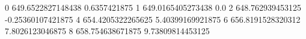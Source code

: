 0 649.6522827148438 0.6357421875
1 649.0165405273438 0.0
2 648.762939453125 -0.25360107421875
4 654.4205322265625 5.40399169921875
6 656.8191528320312 7.8026123046875
8 658.754638671875 9.73809814453125
